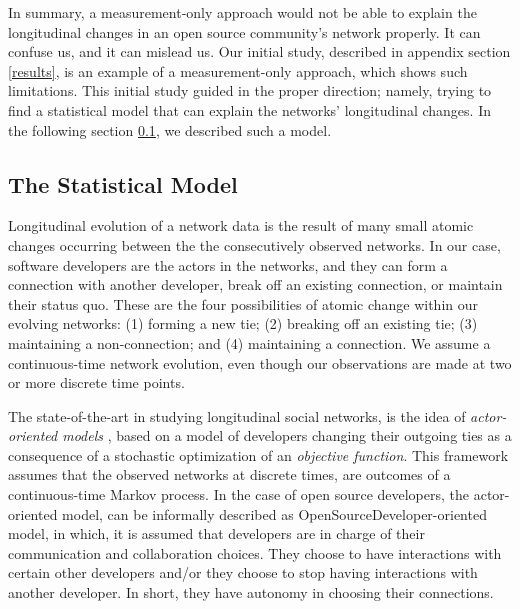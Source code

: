 \documentclass[11pt]{report}
\begin{document}
In summary, a measurement-only approach would not be able to explain the longitudinal changes in an open source community's network properly. It can confuse us, and it can mislead us. Our initial study, described in appendix section \ref{results}, is an example of a measurement-only approach, which shows such limitations. This initial study guided in the proper direction; namely, trying to find a statistical model that can explain the networks' longitudinal changes. In the following section \ref{statisticalModel}, we described such a model.  


%

\subsection{The Statistical Model}
\label{statisticalModel}

Longitudinal evolution of a network data is the result of many small atomic changes occurring between the the consecutively observed networks. In our case, software developers are the actors in the networks, and they can form a connection with another developer, break off an existing connection, or maintain their status quo. These are the four possibilities of atomic change within our evolving networks: (1) forming a new tie; (2) breaking off an existing tie; (3) maintaining a non-connection; and (4) maintaining a connection. We assume a continuous-time network evolution, even though our observations are made at two or more discrete time points. 

The state-of-the-art in studying longitudinal social networks, is the idea of \textit{actor-oriented models} \cite{Snijders2010}, based on a model of developers changing their outgoing ties as a consequence of a stochastic optimization of an \textit{objective function}. This framework assumes that the observed networks at discrete times, are outcomes of a continuous-time Markov process. In the case of open source developers, the actor-oriented model, can be informally described as OpenSourceDeveloper-oriented model, in which, it is assumed that developers are in charge of their communication and collaboration choices. They choose to have interactions with certain other developers and/or they choose to stop having interactions with another developer. In short, they have autonomy in choosing their connections.
\end{document}
